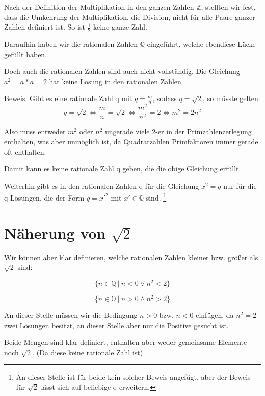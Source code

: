 \documentclass[12pt]{article}
\begin{document}
    Nach der Definition der Multiplikation in den ganzen Zahlen $\mathbb{Z}$, stellten wir fest, dass
    die Umkehrung der Multiplikation, die Division, nicht für alle Paare ganzer Zahlen definiert ist.
    So ist $\frac{1}{2}$ keine ganze Zahl.

    Daraufhin haben wir die rationalen Zahlen $\mathbb{Q}$ eingeführt, welche ebendiese Lücke gefüllt haben.

    Doch auch die rationalen Zahlen sind auch nicht vollständig.
    Die Gleichung $a^2 = a * a = 2$ hat keine Lösung in den rationalen Zahlen.
    
    Beweis:
    Gibt es eine rationale Zahl q mit $q = \frac{m}{n}$, sodass $q = \sqrt{2}$, so müsste gelten:
    \[
        q = \sqrt{2} \Leftrightarrow \frac{m}{n} = \sqrt{2} \Leftrightarrow \frac{m^2}{n^2} = 2 \Leftrightarrow m^2 = 2n^2
    \]

    Also muss entweder $m^2$ oder $n^2$ ungerade viele 2-er in der
    Primzahlenzerlegung enthalten, was aber unmöglich ist, da Quadratzahlen Primfaktoren immer gerade oft enthalten.
    
    Damit kann es keine rationale Zahl q geben, die die obige Gleichung erfüllt.

    Weiterhin gibt es in den rationalen Zahlen q für die Gleichung $x^2 = q$ nur für die q Lösungen,
    die der Form $q = x'^2$ mit $x' \in \mathbb{Q}$ sind.
    \footnote{
        An dieser Stelle ist für beide kein solcher Beweis angefügt, aber der Beweis für $\sqrt{2}$ lässt
        sich auf beliebige q erweitern.
    }

    \section{Näherung von $\sqrt{2}$}

    Wir können aber klar definieren, welche rationalen Zahlen kleiner bzw. größer als $\sqrt{2}$ sind:

    \[\{n \in \mathbb{Q} \mspace{4mu} | \mspace{4mu} n < 0 \lor n^2 < 2\}\]

    \[\{n \in \mathbb{Q} \mspace{4mu} | \mspace{4mu} n > 0 \land n^2 > 2\}\]

    An dieser Stelle müssen wir die Bedingung $n > 0$ bzw. $n < 0$ einfügen, da $n ^ 2 = 2$ zwei Lösungen besitzt,
    an dieser Stelle aber nur die Positive gesucht ist.

    Beide Mengen sind klar definiert, enthalten aber weder gemeinsame Elemente noch $\sqrt{2}$.
    (Da diese keine rationale Zahl ist)
\end{document}

